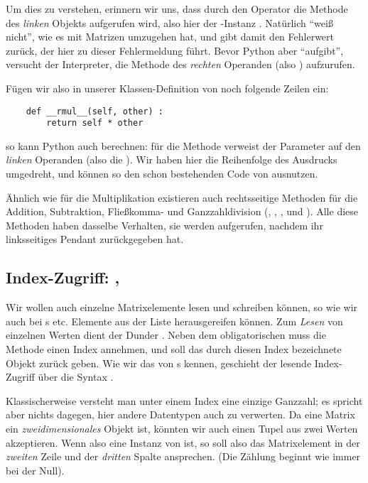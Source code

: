 Um dies zu verstehen, erinnern wir uns, dass durch den Operator \inPy{*} die Methode  des \emph{linken} Objekts aufgerufen wird, also hier der -Instanz . Natürlich \enquote{weiß  nicht}, wie es mit Matrizen umzugehen hat, und gibt damit den Fehlerwert  zurück, der hier zu dieser Fehlermeldung führt. Bevor Python aber \enquote{aufgibt}, versucht der Interpreter, die Methode  des \emph{rechten} Operanden (also ) aufzurufen.

Fügen wir also in unserer Klassen-Definition von  noch folgende Zeilen ein:
\begin{codebox}
\begin{verbatim}
    def __rmul__(self, other) :
        return self * other
\end{verbatim}
\end{codebox}

so kann Python auch  berechnen: für die Methode  verweist der Parameter  auf den \emph{linken} Operanden (also die ). Wir haben hier die Reihenfolge des Ausdrucks umgedreht, und können so den schon bestehenden Code von  ausnutzen.

Ähnlich wie für die Multiplikation existieren auch rechtsseitige Methoden für die Addition, Subtraktion, Fließkomma- und Ganzzahldivision (, , , und ). Alle diese Methoden haben dasselbe Verhalten, \ie sie werden aufgerufen, nachdem ihr linksseitiges Pendant  zurückgegeben hat.


\subsection{Index-Zugriff: , }
Wir wollen auch einzelne Matrixelemente lesen und schreiben können, so wie wir auch bei s etc. Elemente aus der Liste herausgereifen können. Zum \emph{Lesen} von einzelnen Werten dient der Dunder . Neben dem obligatorischen  muss die Methode einen Index annehmen, und soll das durch diesen Index bezeichnete Objekt zurück geben. Wie wir das von s kennen, geschieht der lesende Index-Zugriff über die Syntax .

Klassischerweise versteht man unter einem Index eine einzige Ganzzahl; es spricht aber nichts dagegen, hier andere Datentypen auch zu verwerten. Da eine Matrix ein \emph{zweidimensionales} Objekt ist, könnten wir auch einen Tupel aus zwei Werten akzeptieren. Wenn  also eine Instanz von  ist, so soll  also das Matrixelement in der \emph{zweiten} Zeile und der \emph{dritten} Spalte ansprechen. (Die Zählung beginnt wie immer bei der Null).

